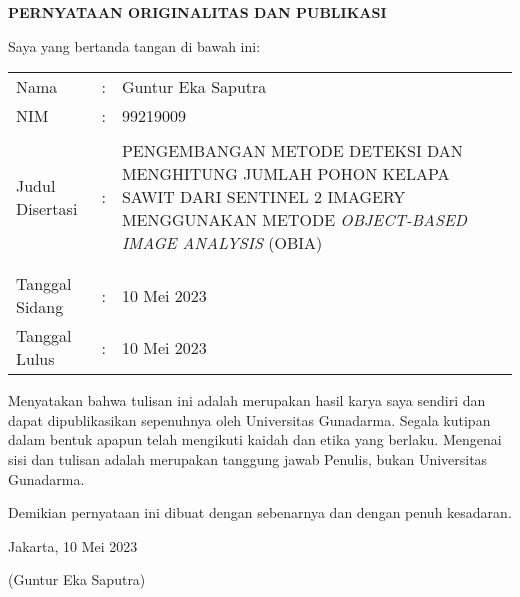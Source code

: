 \newpage %
\begin{center}
\begin{large}\textbf{PERNYATAAN ORIGINALITAS DAN PUBLIKASI}\\\end{large}
\end{center}
\vspace{1cm}
\begin{flushleft}
  Saya yang bertanda tangan di bawah ini:

\hspace{-0.2cm}\begin{tabular}{llp{10cm}}
  Nama & : & Guntur Eka Saputra\\
  NIM & : & 99219009 \\
    & &  \\
    
  Judul Disertasi & : & PENGEMBANGAN METODE DETEKSI DAN MENGHITUNG JUMLAH POHON KELAPA SAWIT DARI SENTINEL 2 IMAGERY MENGGUNAKAN METODE \textit{OBJECT-BASED IMAGE ANALYSIS} (OBIA) \\
   & &  \\
    & &  \\
    Tanggal Sidang & : & 10 Mei 2023\\
    Tanggal Lulus & : & 10 Mei 2023\\
\end{tabular}


%
%
%
%
%
%
%



\end{flushleft}
Menyatakan bahwa tulisan ini adalah merupakan hasil karya saya sendiri dan dapat dipublikasikan sepenuhnya oleh Universitas Gunadarma. Segala kutipan dalam bentuk apapun telah mengikuti kaidah dan etika yang berlaku. Mengenai sisi dan tulisan adalah merupakan tanggung jawab Penulis, bukan Universitas Gunadarma.

Demikian pernyataan ini dibuat dengan sebenarnya dan dengan penuh kesadaran.
\vspace{0.5 cm}
\begin{flushleft}

Jakarta, 10 Mei 2023%

\vspace{2.5 cm}
(Guntur Eka Saputra)
\end{flushleft} 